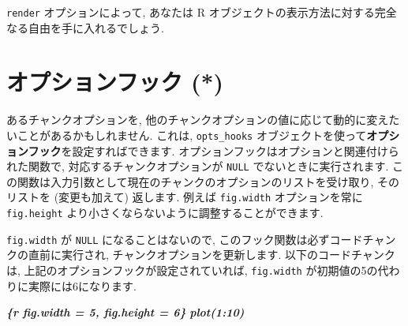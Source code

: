 \documentclass[
  11pt,
  lualatex,
  ja=standard]{bxjsreport}
\newenvironment{Shaded}{\begin{snugshade}}{\end{snugshade}}
\newcommand{\AttributeTok}[1]{\textcolor[rgb]{0.77,0.63,0.00}{#1}}
\newcommand{\ControlFlowTok}[1]{\textcolor[rgb]{0.13,0.29,0.53}{\textbf{#1}}}
\newcommand{\FunctionTok}[1]{\textcolor[rgb]{0.00,0.00,0.00}{#1}}
\newcommand{\InformationTok}[1]{\textcolor[rgb]{0.56,0.35,0.01}{\textbf{\textit{#1}}}}
\newcommand{\NormalTok}[1]{#1}
\newcommand{\OtherTok}[1]{\textcolor[rgb]{0.56,0.35,0.01}{#1}}
\newcommand{\SpecialCharTok}[1]{\textcolor[rgb]{0.00,0.00,0.00}{#1}}
\begin{document}
\texttt{render} オプションによって, あなたは R オブジェクトの表示方法に対する完全なる自由を手に入れるでしょう.

\hypertarget{option-hooks}{%
\section{オプションフック (*)}\label{option-hooks}}

あるチャンクオプションを, 他のチャンクオプションの値に応じて動的に変えたいことがあるかもしれません. これは, \texttt{opts\_hooks} オブジェクトを使って\textbf{オプションフック}を設定すればできます. オプションフックはオプションと関連付けられた関数で, 対応するチャンクオプションが \texttt{NULL} でないときに実行されます. この関数は入力引数として現在のチャンクのオプションのリストを受け取り, そのリストを (変更も加えて) 返します. 例えば \texttt{fig.width} オプションを常に \texttt{fig.height} より小さくならないように調整することができます.

\begin{Shaded}
\end{Shaded}

\texttt{fig.width} が \texttt{NULL} になることはないので, このフック関数は必ずコードチャンクの直前に実行され, チャンクオプションを更新します. 以下のコードチャンクは, 上記のオプションフックが設定されていれば, \texttt{fig.width} が初期値の5の代わりに実際には6になります.

\begin{Shaded}
\begin{Highlighting}[]
\InformationTok{\textasciigrave{}\textasciigrave{}\textasciigrave{}\{r fig.width = 5, fig.height = 6\}}
\InformationTok{plot(1:10)}
\InformationTok{\textasciigrave{}\textasciigrave{}\textasciigrave{}}
\end{Highlighting}
\end{Shaded}
\end{document}
